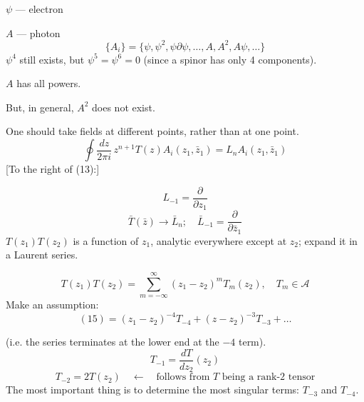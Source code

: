 $\psi$ --- electron

$A$ --- photon
\begin{equation*}
\{A_i\}=\{\psi,\psi^2,\psi\partial\psi,\ldots,A,A^2,A\psi,\ldots\}
\end{equation*}
$\psi^4$ still exists, but $\psi^5=\psi^6=0$ (since a spinor has only 4 components).

$A$ has all powers.

But, in general, $A^2$ does not exist.

One should take fields at different points, rather than at one point.
\begin{equation*}
\oint\frac{dz}{2\pi i}\,z^{n+1}T(z)A_i(z_1,\bar z_1)
=L_nA_i(z_1,\bar z_1)
\tag{13}
\end{equation*}
[To the right of (13):]
\begin{center}
\end{center}
\begin{equation*}
L_{-1}=\frac{\partial}{\partial z_1}
\end{equation*}
\begin{equation*}
\bar T(\bar z)\to\bar L_n;\quad
\bar L_{-1}=\frac{\partial}{\partial\bar z_1}
\tag{14}
\end{equation*}
$T(z_1)T(z_2)$ is a function of $z_1$, analytic everywhere except at $z_2$;
expand it in a Laurent series.

\begin{equation*}
T(z_1)T(z_2)=\sum_{m=-\infty}^{\infty}(z_1-z_2)^m T_m(z_2),\quad T_m\in\mathcal A
\tag{15}
\end{equation*}
Make an assumption:
\begin{equation*}
(15)=(z_1-z_2)^{-4}T_{-4}+(z-z_2)^{-3}T_{-3}+\ldots
\tag{16}
\end{equation*}

(i.e. the series terminates at the lower end at the $-4$ term).
\begin{equation*}
T_{-1}=\frac{dT}{dz_2}(z_2)
\tag{17}
\end{equation*}
\begin{equation*}
T_{-2}=2T(z_2)\quad\leftarrow\quad
\text{follows from $T$ being a rank-2 tensor}
\tag{18}
\end{equation*}
The most important thing is to determine the most singular terms: $T_{-3}$ and $T_{-4}$.

